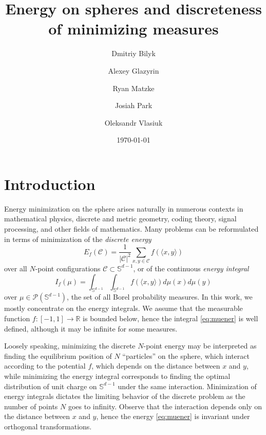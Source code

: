 \documentclass[11pt, leqno]{amsart}
\title{Energy on spheres and discreteness of minimizing measures}
\date{\today}
\author{Dmitriy Bilyk}
\author{Alexey Glazyrin}
\author{Ryan Matzke}
\author{Josiah Park}
\author{Oleksandr Vlasiuk}
\def\R{\mathbb R}
\def\S{\mathbb S}
\theoremstyle{definition}
\numberwithin{equation}{section}
\begin{document}
 

\maketitle




\section{Introduction}\label{sec:Intro}

Energy minimization on the sphere arises naturally in numerous contexts in mathematical physics, discrete and metric geometry, coding theory, signal processing, and  other fields of mathematics.  Many problems can be reformulated in terms of  minimization of the {\em{discrete energy}}
\begin{equation}\label{eq:poten}
   E_f (\mathcal C) = \frac{1}{|\mathcal C|^2}  \sum\limits_{x, y\in\mathcal{C}} f( \langle x, y \rangle)
\end{equation} 
over all $N$-point configurations $\mathcal C \subset \S^{d-1}$, or of the continuous {\em{energy integral}} 
\begin{equation}\label{eq:muener}
    I_{f}(\mu)=\int_{\S^{d-1}}\int_{\S^{d-1}} f (\langle x,y \rangle )  d\mu(x)d\mu(y)
\end{equation} 
over $\mu \in \mathcal P (\S^{d-1})$, the set of all Borel probability measures. In this work, we mostly concentrate on the energy integrals.  We assume that the measurable function $f: [-1,1]\rightarrow \R$ is bounded below, hence the integral \eqref{eq:muener} is well defined, although it may be infinite for some measures. 

Loosely speaking, minimizing the discrete $N$-point energy may be interpreted as finding the equilibrium position of $N$ ``particles'' on the sphere, which interact  according to the potential $f$, which depends on the distance between $x$ and $y$, while minimizing  the energy integral corresponds to finding the optimal distribution of unit charge on $\S^{d-1}$ under the same interaction. Minimization of energy integrals dictates the limiting behavior of the discrete problem as the number of points  $N$ goes to infinity. Observe that the interaction depends only on the distance between $x$ and $y$, hence the energy \eqref{eq:muener} is invariant under orthogonal transformations. 
\end{document}
